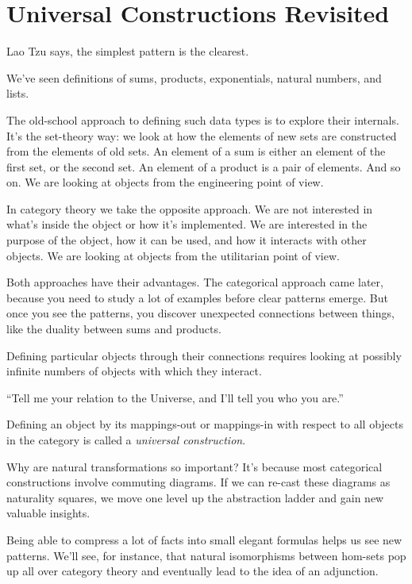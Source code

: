 \documentclass[DaoFP]{subfiles}
\begin{document}
\section{Universal Constructions Revisited}

Lao Tzu says, the simplest pattern is the clearest.

We've seen definitions of sums, products, exponentials, natural numbers, and lists. 

The old-school approach to defining such data types is to explore their internals. It's the set-theory way: we look at how the elements of new sets are constructed from the elements of old sets. An element of a sum is either an element of the first set, or the second set. An element of a product is a pair of elements. And so on. We are looking at objects from the engineering point of view.

In category theory we take the opposite approach. We are not interested in what's inside the object or how it's implemented. We are interested in the purpose of the object, how it can be used, and how it interacts with other objects. We are looking at objects from the utilitarian point of view.

Both approaches have their advantages. The categorical approach came later, because you need to study a lot of examples before clear patterns emerge. But once you see the patterns, you discover unexpected connections between things, like the duality between sums and products.

Defining particular objects through their connections requires looking at possibly infinite numbers of objects with which they interact. 

``Tell me your relation to the Universe, and I'll tell you who you are.''

Defining an object by its mappings-out or mappings-in with respect to all objects in the category is called a \emph{universal construction}. 

Why are natural transformations so important? It's because most categorical constructions involve commuting diagrams. If we can re-cast these diagrams as naturality squares, we move one level up the abstraction ladder and gain new valuable insights.

Being able to compress a lot of facts into small elegant formulas helps us see new patterns. We'll see, for instance, that natural isomorphisms between hom-sets pop up all over category theory and eventually lead to the idea of an adjunction.
\end{document}
